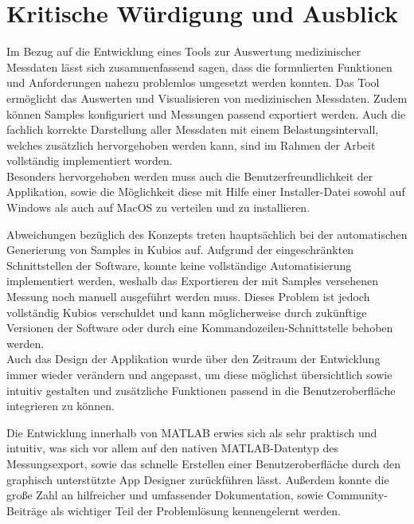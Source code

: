 
\chapter{Kritische Würdigung und Ausblick}
Im Bezug auf die Entwicklung eines Tools zur Auswertung medizinischer Messdaten lässt sich zusammenfassend sagen, dass die formulierten Funktionen und Anforderungen nahezu problemlos umgesetzt werden konnten. Das Tool ermöglicht das Auswerten und Visualisieren von medizinischen Messdaten. Zudem können Samples konfiguriert und Messungen passend exportiert werden. Auch die fachlich korrekte Darstellung aller Messdaten mit einem Belastungsintervall, welches zusätzlich hervorgehoben werden kann, sind im Rahmen der Arbeit vollständig implementiert worden.\\
Besonders hervorgehoben werden muss auch die Benutzerfreundlichkeit der Applikation, sowie die Möglichkeit diese mit Hilfe einer Installer-Datei sowohl auf Windows als auch auf MacOS zu verteilen und zu installieren.

Abweichungen bezüglich des Konzepts treten hauptsächlich bei der automatischen Generierung von Samples in Kubios auf. Aufgrund der eingeschränkten Schnittstellen der Software, konnte keine vollständige Automatisierung implementiert werden, weshalb das Exportieren der mit Samples versehenen Messung noch manuell ausgeführt werden muss. Dieses Problem ist jedoch vollständig Kubios verschuldet und kann möglicherweise durch zukünftige Versionen der Software oder durch eine Kommandozeilen-Schnittstelle behoben werden.\\
Auch das Design der Applikation wurde über den Zeitraum der Entwicklung immer wieder verändern und angepasst, um diese möglichst übersichtlich sowie intuitiv gestalten und zusätzliche Funktionen passend in die Benutzeroberfläche integrieren zu können.

Die Entwicklung innerhalb von MATLAB erwies sich als sehr praktisch und intuitiv, was sich vor allem auf den nativen MATLAB-Datentyp des Messungsexport, sowie das schnelle Erstellen einer Benutzeroberfläche durch den graphisch unterstützte App Designer zurückführen lässt. Außerdem konnte die große Zahl an hilfreicher und umfassender Dokumentation, sowie Community-Beiträge als wichtiger Teil der Problemlösung kennengelernt werden.

